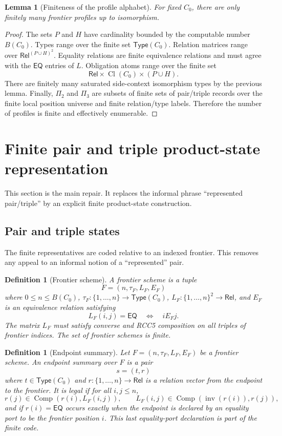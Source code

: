 \documentclass[11pt]{article}
\newtheorem{lemma}[theorem]{Lemma}
\newtheorem{definition}[theorem]{Definition}
\newcommand{\Rel}{\mathsf{Rel}}
\newcommand{\EQ}{\mathsf{EQ}}
\newcommand{\Comp}{\operatorname{Comp}}
\newcommand{\Inv}{\operatorname{inv}}
\newcommand{\Cl}{\operatorname{Cl}}
\newcommand{\Typ}{\mathsf{Type}}
\begin{document}
\begin{lemma}[Finiteness of the profile alphabet]
For fixed $C_0$, there are only finitely many frontier profiles up to isomorphism.
\end{lemma}

\begin{proof}
The sets $P$ and $H$ have cardinality bounded by the computable number $B(C_0)$.  Types range over the finite set $\Typ(C_0)$.  Relation matrices range over $\Rel^{(P\cup H)^2}$.  Equality relations are finite equivalence relations and must agree with the $\EQ$ entries of $L$.  Obligation atoms range over the finite set
\[
  \Rel\times\Cl(C_0)\times(P\cup H).
\]
There are finitely many saturated side-context isomorphism types by the previous lemma.  Finally, $\Pi_2$ and $\Pi_3$ are subsets of finite sets of pair/triple records over the finite local position universe and finite relation/type labels.  Therefore the number of profiles is finite and effectively enumerable.
\end{proof}

\section{Finite pair and triple product-state representation}

This section is the main repair.  It replaces the informal phrase ``represented pair/triple'' by an explicit finite product-state construction.


\subsection{Pair and triple states}

The finite representatives are coded relative to an indexed frontier.  This removes any appeal to an informal notion of a ``represented'' pair.

\begin{definition}[Frontier scheme]
A frontier scheme is a tuple
\[
  F=(n,\tau_F,L_F,E_F)
\]
where $0\le n\le B(C_0)$, $\tau_F:\{1,\ldots,n\}\to\Typ(C_0)$, $L_F:\{1,\ldots,n\}^2\to\Rel$, and $E_F$ is an equivalence relation satisfying
\[
  L_F(i,j)=\EQ\quad\Longleftrightarrow\quad iE_Fj.
\]
The matrix $L_F$ must satisfy converse and RCC5 composition on all triples of frontier indices.  The set of frontier schemes is finite.
\end{definition}

\begin{definition}[Endpoint summary]
Let $F=(n,\tau_F,L_F,E_F)$ be a frontier scheme.  An endpoint summary over $F$ is a pair
\[
  s=(t,r)
\]
where $t\in\Typ(C_0)$ and $r:\{1,\ldots,n\}\to\Rel$ is a relation vector from the endpoint to the frontier.  It is legal if for all $i,j\le n$,
\[
  r(j)\in\Comp(r(i),L_F(i,j)),
  \qquad
  L_F(i,j)\in\Comp(\Inv(r(i)),r(j)),
\]
and if $r(i)=\EQ$ occurs exactly when the endpoint is declared by an equality port to be the frontier position $i$.  This last equality-port declaration is part of the finite code.
\end{definition}
\end{document}
